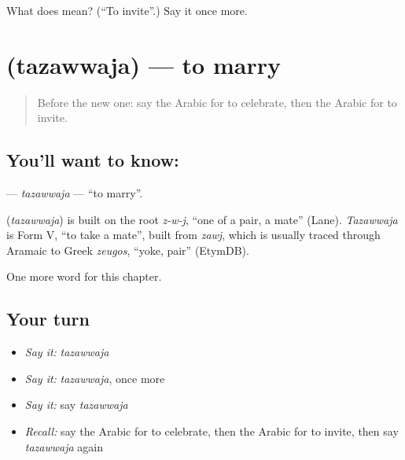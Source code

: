 \begin{tcolorbox}[breakable,colback=teal!4,colframe=teal!35!black,title={Before you move on}]
What does  mean? (\textquotedblleft{}To invite\textquotedblright{}.) Say it once more.
\end{tcolorbox}
\section[\texorpdfstring{\ar{تزوج} (tazawwaja)}{تزوج (tazawwaja)}]{ (tazawwaja) — to marry}

\label{lesson:AR-C163-tazawwaja}



\begin{quote}
Before the new one: say the Arabic for to celebrate, then the Arabic for to invite.
\end{quote}

\subsection*{You'll want to know: }
\textbf{} — \emph{tazawwaja} — \textquotedblleft{}to marry\textquotedblright{}.

\begin{cousinweb}
\textbf{} (\emph{tazawwaja}) is built on the root \emph{z-w-j}, \textquotedblleft{}one of a pair, a mate\textquotedblright{} (Lane). \emph{Tazawwaja} is Form V, \textquotedblleft{}to take a mate\textquotedblright{}, built from \emph{zawj}, which is usually traced through Aramaic to Greek \emph{zeugos}, \textquotedblleft{}yoke, pair\textquotedblright{} (EtymDB).
\end{cousinweb}

\begin{grammarlens}[title={What you've built}]
One more word for this chapter.
\end{grammarlens}

\subsection*{Your turn}
\begin{itemize}
\raggedright
  \item \emph{Say it:} \emph{tazawwaja}
  \item \emph{Say it:} \emph{tazawwaja}, once more
  \item \emph{Say it:} say \emph{tazawwaja}
  \item \emph{Recall:} say the Arabic for to celebrate, then the Arabic for to invite, then say \emph{tazawwaja} again
\end{itemize}

